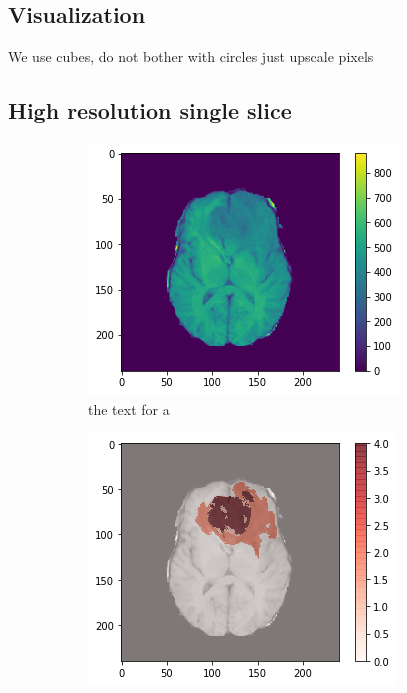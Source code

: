 \subsection{Visualization}
We use cubes, do not bother with circles just upscale pixels

\subsection{High resolution single slice}

\begin{figure}[H]
    \centering
    \begin{subfigure}{.33\textwidth}
        \centering
        \includegraphics[width=\linewidth]{chapters/07_brats3d/images/01_t1.png}
        \caption{ the text for a}
    \end{subfigure}%
    \begin{subfigure}{.33\textwidth}
        \centering
        \includegraphics[width=\linewidth]{chapters/07_brats3d/images/05_t1_segment.png}

\end{subfigure}
\end{figure}
